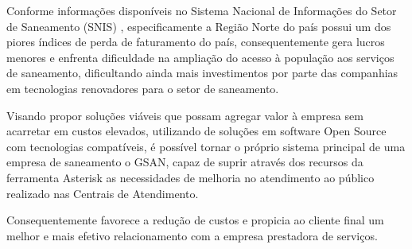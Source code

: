  Conforme informações disponíveis no Sistema Nacional de Informações do Setor de Saneamento (SNIS) \cite{SNIS:2014}, especificamente a Região Norte do país possui um dos piores índices de perda de faturamento do país, consequentemente gera lucros menores e enfrenta dificuldade na ampliação do acesso à população aos serviços de saneamento, dificultando ainda mais investimentos por parte das companhias em tecnologias renovadores para o setor de saneamento.
 
 Visando propor soluções viáveis que possam agregar valor à empresa sem acarretar em custos elevados, utilizando de soluções em software Open Source com tecnologias compatíveis, é possível tornar o próprio sistema principal de uma empresa de saneamento o GSAN, capaz de suprir através dos recursos da ferramenta Asterisk as necessidades de melhoria no atendimento ao público realizado nas Centrais de Atendimento.
 
 Consequentemente favorece a redução de custos e propicia ao cliente final um melhor e mais efetivo relacionamento com a empresa prestadora de serviços.

